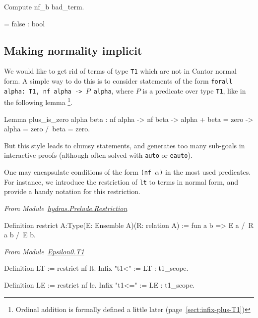 \begin{Coqsrc}
 Compute nf_b bad_term.
\end{Coqsrc}

\begin{Coqanswer}
   = false 
     : bool
\end{Coqanswer}



\subsection{Making normality implicit}
  We would like to get rid of terms of type \texttt{T1} which are not in Cantor normal form.
A simple way to do this is to consider statements of the form 
\texttt{forall alpha: T1, nf alpha -> $P$ alpha}, where $P$ is a predicate over type \texttt{T1}, like in the following lemma \footnote{Ordinal addition is formally defined a little later (page~\ref{sect:infix-plus-T1})}.

\begin{Coqsrc}
Lemma plus_is_zero alpha beta :
  nf alpha -> nf beta ->
  alpha + beta  = zero -> alpha = zero /\  beta = zero.
\end{Coqsrc}

But this style leads to clumsy statements, and generates too many sub-goals in interactive proofs (although often solved with \texttt{auto} or \texttt{eauto}).

One may encapsulate conditions of the form \texttt{(nf $\alpha$)} in
the most used predicates. For instance, we introduce the restriction of \texttt{lt} to terms in normal form, and provide a handy notation for this restriction.

\vspace{4pt}
\emph{From Module~\href{../theories/html/hydras.Prelude.Restriction.html}{hydras.Prelude.Restriction}}

\begin{Coqsrc}
Definition restrict {A:Type}(E: Ensemble A)(R: relation A) :=
    fun a b => E a /\ R a b /\ E b.
 \end{Coqsrc}

 
\vspace{4pt}
\emph{From Module~\href{../theories/html/hydras.Epsilon0.T1.html\#LT}{Epsilon0.T1}}

\begin{Coqsrc}
Definition LT := restrict nf lt.
Infix "t1<" := LT : t1_scope.

Definition LE := restrict nf le.
Infix "t1<=" := LE : t1_scope.
\end{Coqsrc}


